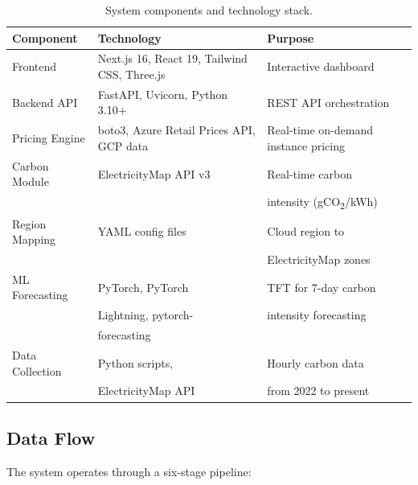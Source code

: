 \documentclass[12pt]{article}
\begin{document}
\begin{table}[htbp]
\centering
\caption{System components and technology stack.}
\label{tab:components}
\footnotesize
\setlength{\tabcolsep}{4pt}
\begin{tabular}{p{}p{}p{}}
\toprule
\textbf{Component} & \textbf{Technology} & \textbf{Purpose} \\
\midrule
Frontend & Next.js 16, React 19, Tailwind CSS, Three.js & Interactive dashboard \\
\midrule
Backend API & FastAPI, Uvicorn, Python 3.10+ & REST API orchestration \\
\midrule
Pricing Engine & boto3, Azure Retail Prices API, GCP data & Real-time on-demand instance pricing \\
\midrule
Carbon Module & ElectricityMap API v3 & Real-time carbon \\
              & & intensity (gCO\textsubscript{2}/kWh) \\
\midrule
Region Mapping & YAML config files & Cloud region to \\
               & & ElectricityMap zones \\
\midrule
ML Forecasting & PyTorch, PyTorch & TFT for 7-day carbon \\
               & Lightning, pytorch- & intensity forecasting \\
               & forecasting & \\
\midrule
Data Collection & Python scripts, & Hourly carbon data \\
                & ElectricityMap API & from 2022 to present \\
\bottomrule
\end{tabular}
\end{table}

\subsection{Data Flow}

The system operates through a six-stage pipeline:
\end{document}
